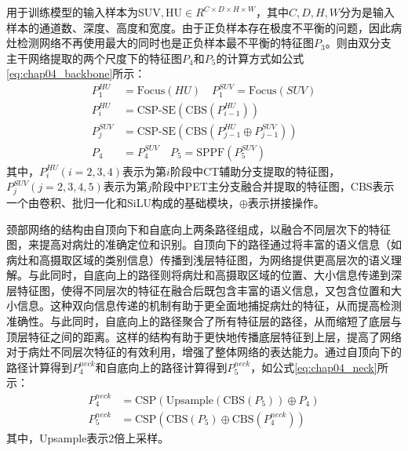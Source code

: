 用于训练模型的输入样本为\(\text{SUV}, \text{HU} \in R^{C \times D \times H \times W}\)，其中\(C,D,H,W\)分为是输入样本的通道数、深度、高度和宽度。由于正负样本存在极度不平衡的问题，因此病灶检测网络不再使用最大的同时也是正负样本最不平衡的特征图\(P_3\)。则由双分支主干网络提取的两个尺度下的特征图\(P_4\)和\(P_5\)的计算方式如公式\ref{eq:chap04_backbone}所示：
\begin{equation}
  \begin{aligned}
    P_1^{HU}  & = \text{Focus}(HU) \quad P_1^{SUV} = \text{Focus}(SUV)         \\
    P_i^{HU}  & = \text{CSP-SE}(\text{CBS}(P^{HU}_{i-1}))                      \\
    P_j^{SUV} & = \text{CSP-SE}(\text{CBS}(P^{HU}_{j-1} \oplus P^{SUV}_{j-1})) \\
    P_4       & = P_4^{SUV} \quad P_5 = \text{SPPF}(P_5^{SUV})
  \end{aligned}
  \label{eq:chap04_backbone}
\end{equation}
其中，\(P_i^{HU}(i=2,3,4)\)表示为第\(i\)阶段中CT辅助分支提取的特征图，\(P_j^{SUV}(j=2,3,4,5)\)表示为第\(j\)阶段中PET主分支融合并提取的特征图，CBS表示一个由卷积、批归一化和SiLU构成的基础模块，\(\oplus\)表示拼接操作。

颈部网络的结构由自顶向下和自底向上两条路径组成，以融合不同层次下的特征图，来提高对病灶的准确定位和识别。自顶向下的路径通过将丰富的语义信息（如病灶和高摄取区域的类别信息）传播到浅层特征图，为网络提供更高层次的语义理解。与此同时，自底向上的路径则将病灶和高摄取区域的位置、大小信息传递到深层特征图，使得不同层次的特征在融合后既包含丰富的语义信息，又包含位置和大小信息。这种双向信息传递的机制有助于更全面地捕捉病灶的特征，从而提高检测准确性。与此同时，自底向上的路径聚合了所有特征层的路径，从而缩短了底层与顶层特征之间的距离。这样的结构有助于更快地传播底层特征到上层，提高了网络对于病灶不同层次特征的有效利用，增强了整体网络的表达能力。通过自顶向下的路径计算得到\(P_4^{neck}\)和自底向上的路径计算得到\(P_5^{neck}\)，如公式\ref{eq:chap04_neck}所示：
\begin{equation}
  \begin{aligned}
    P_4^{neck} & = \text{CSP}(\text{Upsample}(\text{CBS}(P_5)) \oplus P_4)    \\
    P_5^{neck} & =  \text{CSP}(\text{CBS}(P_5) \oplus \text{CBS}(P_4^{neck}))
  \end{aligned}
  \label{eq:chap04_neck}
\end{equation}
其中，Upsample表示2倍上采样。

